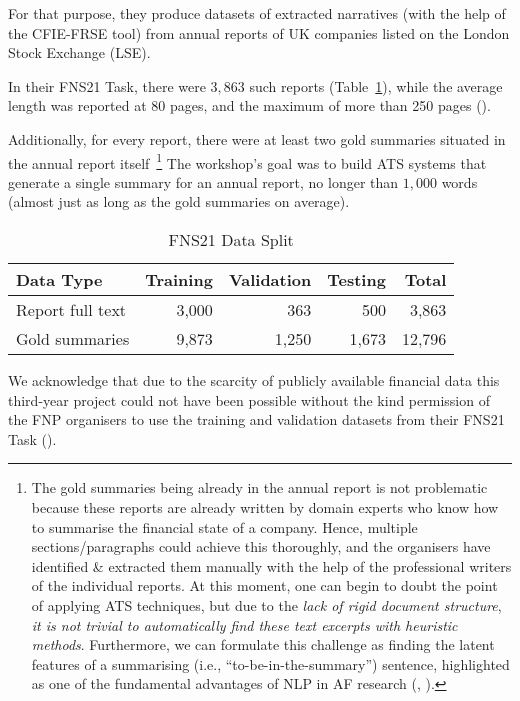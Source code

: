For that purpose, they produce datasets of extracted narratives (with the help of the CFIE-FRSE tool) from annual reports of UK companies listed on the London Stock Exchange (LSE).

In their FNS21 Task, there were $3,863$ such reports (Table~\ref{tab:fns21-data}), while the average length was reported at 80 pages, and the maximum of more than 250 pages (\cite{litvak-vanetik-2021-summarization}).

Additionally, for every report, there were at least two gold summaries situated in the annual report itself~\footnote{
    The gold summaries being already in the annual report is not problematic because these reports are already written by domain experts who know how to summarise the financial state of a company.
    Hence, multiple sections/paragraphs could achieve this thoroughly, and the organisers have identified \& extracted them manually with the help of the professional writers of the individual reports.
    At this moment, one can begin to doubt the point of applying ATS techniques, but due to the \emph{lack of rigid document structure}, \emph{it is not trivial to automatically find these text excerpts with heuristic methods}.
    Furthermore, we can formulate this challenge as finding the latent features of a summarising (i.e., \enquote{to-be-in-the-summary}) sentence, highlighted as one of the fundamental advantages of NLP in AF research (\cite{lewis_young_2019}, \cite{el-haj2019meaning}).
}
The workshop's goal was to build ATS systems that generate a single summary for an annual report, no longer than $1,000$ words (almost just as long as the gold summaries on average).

\begin{table}[h]
    \centering
    \begin{tabular}{lrrr r}
        \hline
        Data Type & Training & Validation & Testing & Total \\
        \midrule
        Report full text & 3,000 & 363 & 500 & 3,863 \\
        Gold summaries & 9,873 & 1,250 & 1,673 & 12,796 \\
        \bottomrule
    \end{tabular}
    \caption{FNS21 Data Split}
    \label{tab:fns21-data}
\end{table}

We acknowledge that due to the scarcity of publicly available financial data this third-year project could not have been possible without the kind permission of the FNP organisers to use the training and validation datasets from their FNS21 Task (\cite{fnp-2021-financial}).

